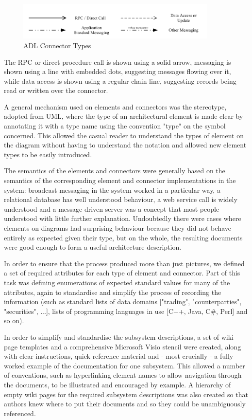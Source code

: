 \begin{figure}
\centering
\includegraphics[width=10cm]{Figures/adls-figure3}
\caption{ADL Connector Types}
\label{figure:adlconnectortypes}
\end{figure}  


  The RPC or direct procedure call is shown using a solid arrow, messaging is shown using a line with embedded dots, suggesting messages flowing over it, while data access is shown using a regular chain line, suggesting records being read or written over the connector.

  A general mechanism used on elements and connectors was the stereotype, adopted from UML, where the type of an architectural element is made clear by annotating it with a type name using the 
convention "{\guillemotleft}type{\guillemotright}" on the symbol concerned.  This allowed the casual reader to understand the types of element on the diagram without having to understand the notation and allowed new element types to be easily introduced.

  The semantics of the elements and connectors were generally based on the semantics of the corresponding element and connector implementations in the system: broadcast messaging in the system worked in a particular way, a relational database has well understood behaviour, a web service call is widely understood and a message driven server was a concept that most people understood with little further explanation.  Undoubtedly there were cases where elements on diagrams had surprising behaviour because they did not behave entirely as expected given their type, but on the whole, the resulting documents were good enough to form a useful architecture description.

  In order to ensure that the process produced more than just pictures, we defined a set of required attributes for each type of element and connector.  Part of this task was defining enumerations of expected standard values for many of the attributes, again to standardise and simplify the process of recording the information (such as standard lists of data domains ["trading", "counterparties", "securities", ...], lists of programming languages in use [C++, Java, C\#, Perl] and so on).

  In order to simplify and standardise the subsystem descriptions, a set of wiki page templates and a comprehensive Microsoft Visio stencil were created, along with clear instructions, quick reference material and - most crucially - a fully worked example of the documentation for one subsystem.  This allowed a number of conventions, such as hyperlinking element names to allow navigation through the documents, to be illustrated and encouraged by example.  A hierarchy of empty wiki pages for the required subsystem descriptions was also created so that authors knew where to put their documents and so they could be unambiguously referenced.


